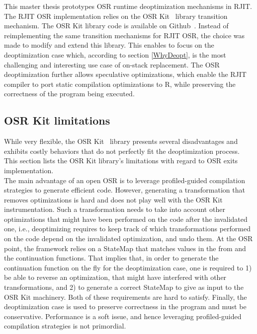 This master thesis prototypes OSR runtime deoptimization mechanisms in RJIT.
The RJIT OSR implementation relies on the OSR Kit~\cite{OSRKit} library transition mechanism.
The OSR Kit library code is available on Github~\cite{OSRKitGit}.
Instead of reimplementing the same transition mechanisms for RJIT OSR, the choice was made to modify and extend this library.
This enables to focus on the deoptimization case which, according to section \ref{WhyDeopt}, is the most challenging and interesting use case of on-stack replacement.
The OSR deoptimization further allows speculative optimizations, which enable the RJIT compiler to port static compilation optimizations to R, while preserving the correctness of the program being executed.\\

\subsection{OSR Kit limitations}\label{osrkitlimitations}

While very flexible, the OSR Kit~\cite{OSRKit} library presents several disadvantages and exhibits costly behaviors that do not perfectly fit the deoptimization process.
This section lists the OSR Kit library's limitations with regard to OSR exits implementation.\\

The main advantage of an open OSR is to leverage profiled-guided compilation strategies to generate efficient code.
However, generating a transformation that removes optimizations is hard and does not play well with the OSR Kit instrumentation.
Such a transformation needs to take into account other optimizations that might have been performed on the code after the invalidated one, i.e., deoptimizing requires to keep track of which transformations performed on the code depend on the invalidated optimization, and undo them.
At the OSR point, the framework relies on a StateMap that matches values in the from and the continuation functions.
That implies that, in order to generate the continuation function on the fly for the deoptimization case, one is required to 1) be able to reverse an optimization, that might have interfered with other transformations, and 2) to generate a correct StateMap to give as input to the OSR Kit machinery.
Both of these requirements are hard to satisfy.
Finally, the deoptimization case is used to preserve correctness in the program and must be conservative. 
Performance is a soft issue, and hence leveraging profiled-guided compilation strategies is not primordial.\\

